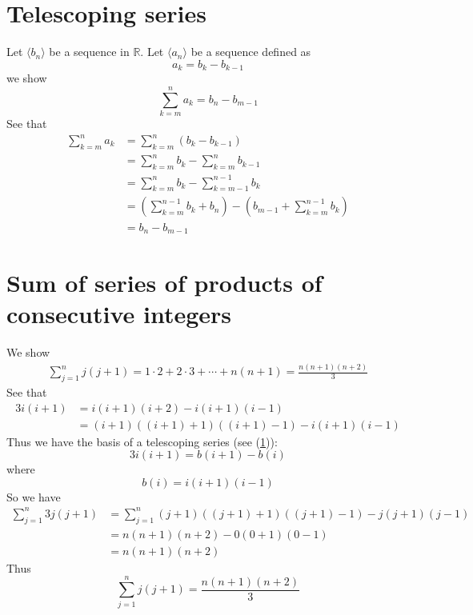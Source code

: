 \documentclass{report}
\begin{document}
\section{Telescoping series}
\label{supnotes:2}
Let $\langle b_n\rangle$ be a sequence in $\mathbb{R}$. Let $\langle a_n\rangle$ be a sequence defined as
\begin{equation*}
a_k=b_k-b_{k-1}
\end{equation*}
we show
\begin{equation*}
\boxed{\sum^n_{k=m}a_k=b_n-b_{m-1}}
\end{equation*}
See that
\begin{align*}
\sum^n_{k=m}a_k&=\sum^n_{k=m}(b_k-b_{k-1})\\
&=\sum^n_{k=m}b_k-\sum^n_{k=m}b_{k-1}\\
&=\sum^n_{k=m}b_k-\sum^{n-1}_{k=m-1}b_k\\
&=\left(\sum^{n-1}_{k=m}b_k+b_n\right)-\left(b_{m-1}+\sum^{n-1}_{k=m}b_k\right)\\
&=b_n-b_{m-1}
\end{align*}
\newpage

\section{Sum of series of products of consecutive integers}
\label{supnotes:3}
We show
\begin{align*}
\boxed{\sum^n_{j=1}j(j+1)=1\cdot2+2\cdot3+\cdots
+n(n+1)=\frac{n(n+1)(n+2)}{3}}
\end{align*}
See that
\begin{align*}
3i(i+1)&=i(i+1)(i+2)-i(i+1)(i-1)\\
&=(i+1)((i+1)+1)((i+1)-1)-i(i+1)(i-1)
\end{align*}
Thus we have the basis of a telescoping series (see (\ref{supnotes:2})):
\begin{equation*}
3i(i+1)=b(i+1)-b(i)
\end{equation*}
where
\begin{equation*}
b(i)=i(i+1)(i-1)
\end{equation*}
So we have
\begin{align*}
\sum^n_{j=1}3j(j+1)&=\sum^n_{j=1}(j+1)((j+1)+1)((j+1)-1)-j(j+1)(j-1)\\
&=n(n+1)(n+2)-0(0+1)(0-1)\\
&=n(n+1)(n+2)
\end{align*}
Thus
\begin{equation*}
\sum^n_{j=1}j(j+1)=\frac{n(n+1)(n+2)}{3}
\end{equation*}
\newpage
\end{document}
